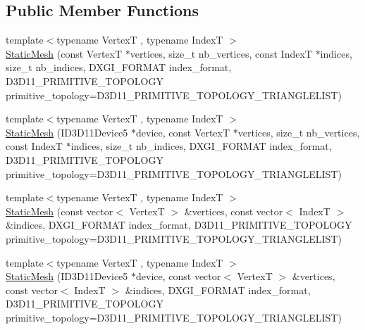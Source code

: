 \subsection*{Public Member Functions}
\begin{DoxyCompactItemize}
\item 
{\footnotesize template$<$typename VertexT , typename IndexT $>$ }\\\hyperlink{classmage_1_1_static_mesh_ad1fb729eb4549c46f357d639127f9724}{Static\+Mesh} (const VertexT $\ast$vertices, size\+\_\+t nb\+\_\+vertices, const IndexT $\ast$indices, size\+\_\+t nb\+\_\+indices, D\+X\+G\+I\+\_\+\+F\+O\+R\+M\+AT index\+\_\+format, D3\+D11\+\_\+\+P\+R\+I\+M\+I\+T\+I\+V\+E\+\_\+\+T\+O\+P\+O\+L\+O\+GY primitive\+\_\+topology=D3\+D11\+\_\+\+P\+R\+I\+M\+I\+T\+I\+V\+E\+\_\+\+T\+O\+P\+O\+L\+O\+G\+Y\+\_\+\+T\+R\+I\+A\+N\+G\+L\+E\+L\+I\+ST)
\item 
{\footnotesize template$<$typename VertexT , typename IndexT $>$ }\\\hyperlink{classmage_1_1_static_mesh_ac9f230b6a55835ce058129b1762edff6}{Static\+Mesh} (I\+D3\+D11\+Device5 $\ast$device, const VertexT $\ast$vertices, size\+\_\+t nb\+\_\+vertices, const IndexT $\ast$indices, size\+\_\+t nb\+\_\+indices, D\+X\+G\+I\+\_\+\+F\+O\+R\+M\+AT index\+\_\+format, D3\+D11\+\_\+\+P\+R\+I\+M\+I\+T\+I\+V\+E\+\_\+\+T\+O\+P\+O\+L\+O\+GY primitive\+\_\+topology=D3\+D11\+\_\+\+P\+R\+I\+M\+I\+T\+I\+V\+E\+\_\+\+T\+O\+P\+O\+L\+O\+G\+Y\+\_\+\+T\+R\+I\+A\+N\+G\+L\+E\+L\+I\+ST)
\item 
{\footnotesize template$<$typename VertexT , typename IndexT $>$ }\\\hyperlink{classmage_1_1_static_mesh_afb1c3ff87eae3811b33a5ff236e2ba76}{Static\+Mesh} (const vector$<$ VertexT $>$ \&vertices, const vector$<$ IndexT $>$ \&indices, D\+X\+G\+I\+\_\+\+F\+O\+R\+M\+AT index\+\_\+format, D3\+D11\+\_\+\+P\+R\+I\+M\+I\+T\+I\+V\+E\+\_\+\+T\+O\+P\+O\+L\+O\+GY primitive\+\_\+topology=D3\+D11\+\_\+\+P\+R\+I\+M\+I\+T\+I\+V\+E\+\_\+\+T\+O\+P\+O\+L\+O\+G\+Y\+\_\+\+T\+R\+I\+A\+N\+G\+L\+E\+L\+I\+ST)
\item 
{\footnotesize template$<$typename VertexT , typename IndexT $>$ }\\\hyperlink{classmage_1_1_static_mesh_af90d313544c6e0167c9ae1919a9b0314}{Static\+Mesh} (I\+D3\+D11\+Device5 $\ast$device, const vector$<$ VertexT $>$ \&vertices, const vector$<$ IndexT $>$ \&indices, D\+X\+G\+I\+\_\+\+F\+O\+R\+M\+AT index\+\_\+format, D3\+D11\+\_\+\+P\+R\+I\+M\+I\+T\+I\+V\+E\+\_\+\+T\+O\+P\+O\+L\+O\+GY primitive\+\_\+topology=D3\+D11\+\_\+\+P\+R\+I\+M\+I\+T\+I\+V\+E\+\_\+\+T\+O\+P\+O\+L\+O\+G\+Y\+\_\+\+T\+R\+I\+A\+N\+G\+L\+E\+L\+I\+ST)

\end{DoxyCompactItemize}
